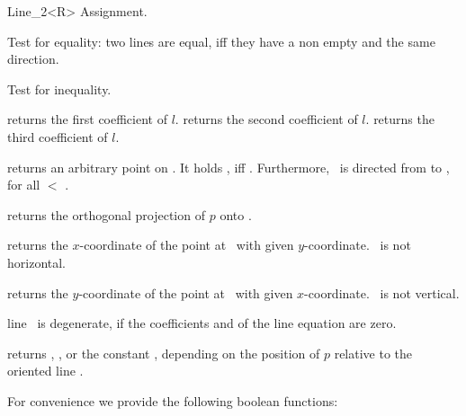 \begin{ccRefClass} {Line_2<R>}
\ccHidden {}
        {Assignment.}

       {Test for equality: two lines are equal, iff they have a non 
        empty  and the same direction.}

       {Test for inequality.}


       {returns the first coefficient of $l$.}
\ccGlue
{}
       {returns the second coefficient of $l$.}
\ccGlue
{}
       {returns the third coefficient of $l$.}

       {returns an arbitrary point on \ccVar. It holds 
        , iff .
        Furthermore, \ccVar\ is directed from 
        to , for all  $<$ .}

       {returns the orthogonal projection of $p$ onto \ccVar.}

       {returns the $x$-coordinate of the point at \ccVar\ with
        given $y$-coordinate.
        \ccPrecond \ccVar\ is not horizontal.}

       {returns the $y$-coordinate of the point at \ccVar\ with
        given $x$-coordinate.
        \ccPrecond \ccVar\ is not vertical.}


       {line \ccVar\ is degenerate, if the coefficients  and 
         of the line equation are zero.}

       {}
\ccGlue
{}
       {}

       {returns ,
        , or the constant
        ,
        depending on the position of $p$  relative to the oriented line \ccVar.
        }


For convenience we provide the following boolean functions:


\end{ccRefClass}
